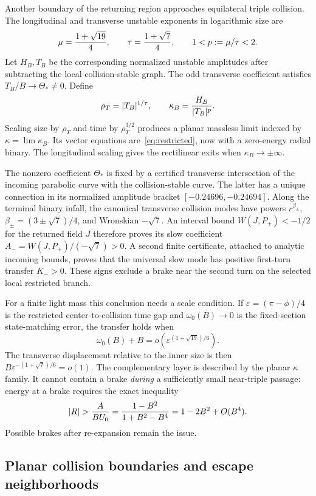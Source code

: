 Another boundary of the returning region approaches equilateral triple
collision. The longitudinal and transverse unstable exponents in
logarithmic size are
\[
 \mu={1+\sqrt{19}\over4},\qquad
 \tau={1+\sqrt7\over4},\qquad 1<p:=\mu/\tau<2.
\]
Let $H_B,T_B$ be the corresponding normalized unstable amplitudes after
subtracting the local collision-stable graph. The odd transverse
coefficient satisfies $T_B/B\to\Theta_*\ne0$. Define
\[
 \rho_T=|T_B|^{1/\tau},\qquad
 \kappa_B={H_B\over|T_B|^p}.
\]
Scaling size by $\rho_T$ and time by $\rho_T^{3/2}$ produces a planar
massless limit indexed by $\kappa=\lim\kappa_B$. Its vector equations
are~\eqref{eq:restricted}, now with a zero-energy radial binary.
The longitudinal scaling gives the rectilinear exits when
$\kappa_B\to\pm\infty$.

The nonzero coefficient $\Theta_*$ is fixed by a certified transverse
intersection of the incoming parabolic curve with the collision-stable
curve. The latter has a unique connection in its normalized amplitude
bracket $[-0.24696,-0.24694]$. Along the terminal binary infall, the
canonical transverse collision modes have powers
$r^{\beta_\pm}$, $\beta_\pm=(3\pm\sqrt7)/4$, and Wronskian
$-\sqrt7$. An interval bound $W(J,P_+)<-1/2$ for the returned field
$J$ therefore proves its slow coefficient
$A_-=W(J,P_+)/(-\sqrt7)>0$. A second finite certificate, attached to
analytic incoming bounds, proves that the universal slow mode has positive
first-turn transfer $K_->0$. These signs exclude a brake near the second
turn on the selected local restricted branch.

For a finite light mass this conclusion needs a scale condition. If
$\varepsilon=(\pi-\phi)/4$ is the restricted center-to-collision time
gap and $\omega_0(B)\to0$ is the fixed-section state-matching error,
the transfer holds when
\[
 \omega_0(B)+B=o(\varepsilon^{(1+\sqrt{19})/6}).
\]
The transverse displacement relative to the inner size is then
$B\varepsilon^{-(1+\sqrt7)/6}=o(1)$. The complementary layer is
described by the planar $\kappa$ family. It cannot contain a brake
\emph{during} a sufficiently small near-triple passage: energy at a
brake requires the exact inequality
\[
 |R|>{A\over BU_0}
 ={1-B^2\over1+B^2-B^4}=1-2B^2+O(B^4).
\]
Possible brakes after re-expansion remain the issue.

\subsection{Planar collision boundaries and escape neighborhoods}

